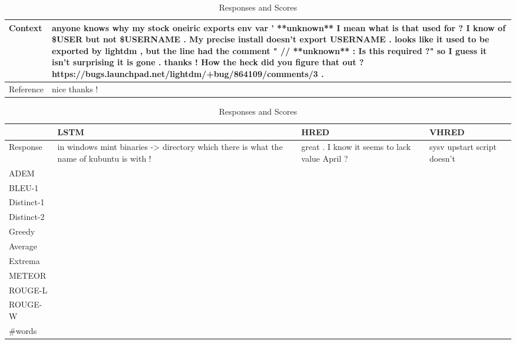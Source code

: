 \begin{table}[htb]
    \caption{An Example from Ubuntu}
    \centering
    \begin{subtable}{\textwidth}
        \centering
        \caption{Context and Reference}
        \begin{tabular}{|l|p{}|}
            \hline
            Context & anyone knows why my stock oneiric exports env var ' **unknown** I mean what is that used for ? I know of \$USER but not \$USERNAME . My precise install doesn't export USERNAME . looks like it used to be exported by lightdm , but the line had the comment " // **unknown** : Is this required ?" so I guess it isn't surprising it is gone . thanks ! How the heck did you figure that out ?  https://bugs.launchpad.net/lightdm/+bug/864109/comments/3 . \\
            \hline
            Reference & nice thanks ! \\
            \hline
        \end{tabular}
    \end{subtable}
    \begin{subtable}{\textwidth}
        \centering
        \caption{Responses and Scores}
        \begin{tabular}{|l|*{3}{p{}|}}
            \hline
            & LSTM & HRED & VHRED \\
            \hline
            Response & in windows mint binaries -> directory which there is what the name of kubuntu is with !  & great . I know it seems to lack value April ?  & sysv upstart script doesn't  \\
            \hline
            ADEM &  \\
            \hline
            BLEU-1 & \\
            \hline
            Distinct-1 &  \\
            \hline
            Distinct-2 &  \\
            \hline
            Greedy &  \\
            \hline
            Average & \\
            \hline
            Extrema &  \\
            \hline
            METEOR & \\
            \hline
            ROUGE-L & \\
            \hline
            ROUGE-W & \\
            \hline
            \#words & \\
            \hline
        \end{tabular}
    \end{subtable}
\end{table}